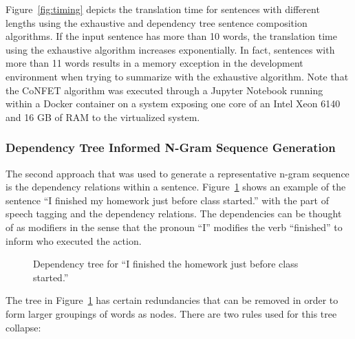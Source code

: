 \documentclass{article}[10]
\begin{document}
Figure~\ref{fig:timing} depicts the translation time for sentences with
different lengths using the exhaustive and dependency tree sentence composition
algorithms. If the input sentence has more than 10 words, the translation time
using the exhaustive algorithm increases exponentially. In fact, sentences with
more than 11 words results in a memory exception in the development environment
when trying to summarize with the exhaustive algorithm. Note that the CoNFET
algorithm was executed through a Jupyter Notebook running within a Docker
container on a system exposing one core of an Intel Xeon 6140 and 16 GB of RAM
to the virtualized system.

\subsubsection{Dependency Tree Informed N-Gram Sequence
  Generation\label{sec:dependency}}

The second approach that was used to generate a representative n-gram sequence
is the dependency relations within a sentence. Figure~\ref{fig:dep} shows an
example of the sentence ``I finished my homework just before class started.''
with the part of speech tagging and the dependency relations. The dependencies
can be thought of as modifiers in the sense that the pronoun ``I'' modifies the
verb ``finished'' to inform who executed the action.

\begin{figure}[H]
  \begin{center}
    \caption{Dependency tree for ``I finished the homework just before class
      started.''\label{fig:dep}}
  \end{center}
\end{figure}

The tree in Figure~\ref{fig:dep} has certain redundancies that can be removed in
order to form larger groupings of words as nodes. There are two rules used for
this tree collapse:
\end{document}
